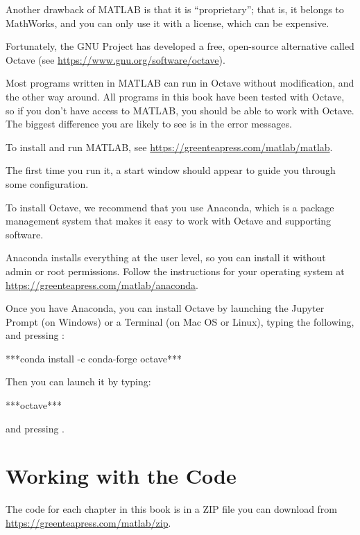 Another drawback of MATLAB is that it is ``proprietary''; that is, it belongs to MathWorks, and you can only use it with a license, which can be expensive.

Fortunately, the GNU Project has developed a free, open-source alternative called Octave (see \url{https://www.gnu.org/software/octave}).  

Most programs written in MATLAB can run in Octave without modification, and the other way around.  All programs in this book have been tested with Octave, so if you don't have access to MATLAB, you should be able to work with Octave.  The biggest difference you are likely to see is in the error messages.

To install and run MATLAB, see \url{https://greenteapress.com/matlab/matlab}.

The first time you run it, a start window should appear to guide you through some configuration.

To install Octave, we recommend that you use Anaconda, which is a package management system that makes it easy to work with Octave and \linebreak supporting software.

Anaconda installs everything at the user level, so you can install it without admin or root permissions.  Follow the instructions for your operating system at \url{https://greenteapress.com/matlab/anaconda}.

Once you have Anaconda, you can install Octave by launching the Jupyter Prompt (on Windows) or a Terminal (on Mac OS or Linux), typing the following, and pressing :

\begin{code}
***conda install -c conda-forge octave***
\end{code}

Then you can launch it by typing:

\begin{code}
***octave***
\end{code}
and pressing .

\section{Working with the Code}


The code for each chapter in this book is in a ZIP file you can download from \url{https://greenteapress.com/matlab/zip}.

